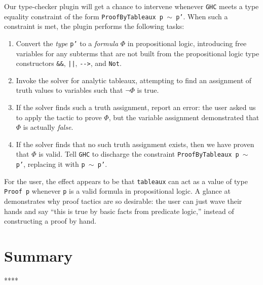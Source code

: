 \documentclass[format=sigplan, review=false, screen=true]{acmart}
\begin{document}
Our type-checker plugin will get a chance to intervene whenever \texttt{GHC}
meets a type equality constraint of the form \texttt{ProofByTableaux p $\sim$ p'}.
When such a constraint is met, the plugin performs the following tasks:
\begin{enumerate}
\item Convert the \emph{type} \texttt{p'} to a \emph{formula} $\Phi$ in propositional
  logic, introducing free variables for any subterms that are not built from the
  propositional logic type constructors \verb|&&|, \verb#||#, \verb|-->|, and \verb|Not|.
\item Invoke the solver for analytic tableaux, attempting to find an assignment of truth
  values to variables such that $\neg \Phi$ is true.
\item If the solver finds such a truth assignment, report an error: the user asked us
  to apply the tactic to prove $\Phi$, but the variable assignment demonstrated that
  $\Phi$ is actually \emph{false}.
\item If the solver finds that no such truth assignment exists, then we have proven that
  $\Phi$ is valid. Tell \texttt{GHC} to discharge the constraint \texttt{ProofByTableaux p $\sim$ p'}, replacing it with \texttt{p $\sim$ p'}.
\end{enumerate}
For the user, the effect appears to be that \texttt{tableaux} can act as a value of
type \texttt{Proof p} whenever \texttt{p} is a valid formula in propositional logic.
A glance at  demonstrates why proof tactics are so desirable:
the user can just wave their hands and say ``this is true by basic facts from predicate logic,''
instead of constructing a proof by hand.

\section*{Summary}
****




\end{document}
